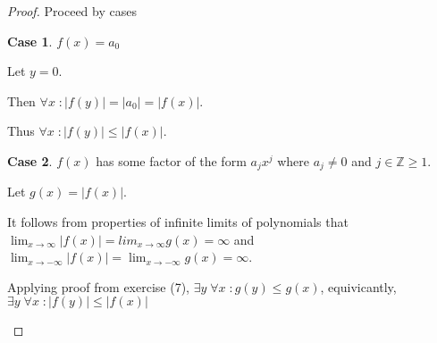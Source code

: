 \documentclass{article} %
\theoremstyle{plain}
\theoremstyle{definition}
\newtheorem{case}{Case}
\begin{document}
\begin{proof}
    Proceed by cases
    \setcounter{case}{0}
    \begin{case} $f(x) = a_0$

        Let $y = 0$.

        Then $\forall x \; \colon |f(y)| = |a_0| = |f(x)|$.

        Thus $\forall x \; \colon |f(y)| \leq |f(x)|$.
    \end{case}
    \begin{case} $f(x)$ has some factor of the form $a_j x^j$ where $a_j \neq 0$ and $j \in \mathbb{Z} \geq 1$.

        Let $g(x) = |f(x)|$.

        It follows from properties of infinite limits of polynomials that $\lim_{x \to \infty} |f(x)| = lim_{x \to \infty} g(x) = \infty$ and $\lim_{x \to -\infty} |f(x)| = \lim_{x \to -\infty} g(x) = \infty$.

        Applying proof from exercise (7), $\exists y \; \forall x \; \colon g(y) \leq g(x)$, equivicantly, $\exists y \; \forall x \; \colon |f(y)| \leq |f(x)|$
    \end{case}
\end{proof}






    





    
    
\end{document}
